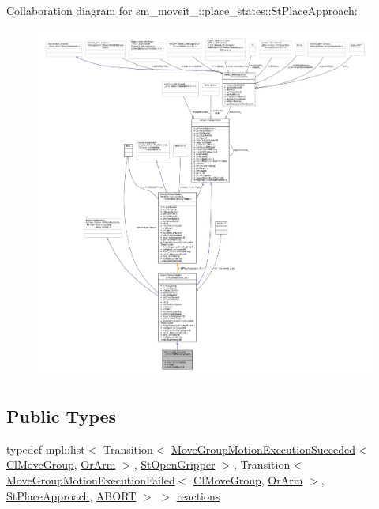 Collaboration diagram for sm\+\_\+moveit\+\_\+:\+:place\+\_\+states\+:\+:St\+Place\+Approach\+:
\nopagebreak
\begin{figure}[H]
\begin{center}
\leavevmode
\includegraphics[width=350pt]{structsm__moveit__2_1_1place__states_1_1StPlaceApproach__coll__graph}
\end{center}
\end{figure}
\subsection*{Public Types}
\begin{DoxyCompactItemize}
\item 
typedef mpl\+::list$<$ Transition$<$ \hyperlink{structmoveit__z__client_1_1MoveGroupMotionExecutionSucceded}{Move\+Group\+Motion\+Execution\+Succeded}$<$ \hyperlink{classmoveit__z__client_1_1ClMoveGroup}{Cl\+Move\+Group}, \hyperlink{classsm__moveit__2_1_1OrArm}{Or\+Arm} $>$, \hyperlink{structsm__moveit__2_1_1place__states_1_1StOpenGripper}{St\+Open\+Gripper} $>$, Transition$<$ \hyperlink{structmoveit__z__client_1_1MoveGroupMotionExecutionFailed}{Move\+Group\+Motion\+Execution\+Failed}$<$ \hyperlink{classmoveit__z__client_1_1ClMoveGroup}{Cl\+Move\+Group}, \hyperlink{classsm__moveit__2_1_1OrArm}{Or\+Arm} $>$, \hyperlink{structsm__moveit__2_1_1place__states_1_1StPlaceApproach}{St\+Place\+Approach}, \hyperlink{classABORT}{A\+B\+O\+RT} $>$ $>$ \hyperlink{structsm__moveit__2_1_1place__states_1_1StPlaceApproach_a30e3124b28e5f312fed5eddad2486915}{reactions}
\end{DoxyCompactItemize}
